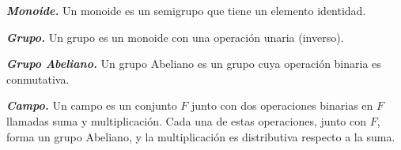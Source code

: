 \documentclass{report}
\begin{document}
\begin{defBox}
    \textit{\textbf{Monoide.}} Un monoide es un semigrupo que tiene un elemento identidad.
\end{defBox}

\begin{defBox}
    \textit{\textbf{Grupo.}} Un grupo es un monoide con una operación unaria (inverso).
\end{defBox}

\begin{defBox}
    \textit{\textbf{Grupo Abeliano.}} Un grupo Abeliano es un grupo cuya operación binaria es conmutativa.
\end{defBox}

\begin{defBox}
    \textit{\textbf{Campo.}} Un campo es un conjunto $F$ junto con dos operaciones binarias en $F$ llamadas suma y multiplicación. Cada una de estas operaciones, junto con $F$, forma un grupo Abeliano, y la multiplicación es distributiva respecto a la suma.
\end{defBox}
\end{document}
